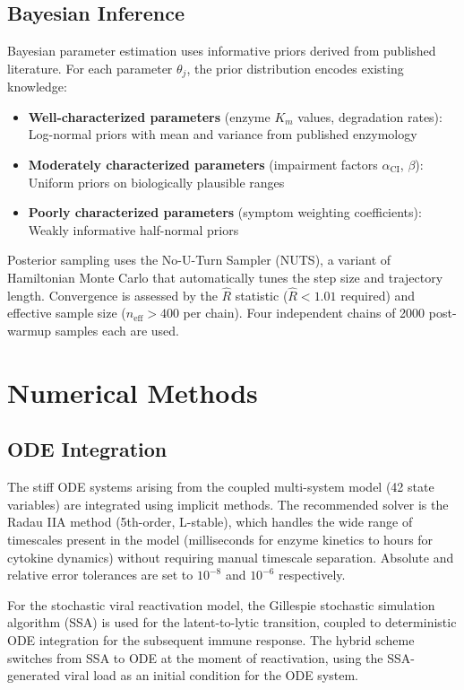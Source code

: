 \subsection{Bayesian Inference}

Bayesian parameter estimation uses informative priors derived from published literature. For each parameter $\theta_j$, the prior distribution encodes existing knowledge:

\begin{itemize}
    \item \textbf{Well-characterized parameters} (enzyme $K_m$ values, degradation rates): Log-normal priors with mean and variance from published enzymology
    \item \textbf{Moderately characterized parameters} (impairment factors $\alpha_{\text{CI}}$, $\beta$): Uniform priors on biologically plausible ranges
    \item \textbf{Poorly characterized parameters} (symptom weighting coefficients): Weakly informative half-normal priors
\end{itemize}

Posterior sampling uses the No-U-Turn Sampler (NUTS), a variant of Hamiltonian Monte Carlo that automatically tunes the step size and trajectory length. Convergence is assessed by the $\hat{R}$ statistic ($\hat{R} < 1.01$ required) and effective sample size ($n_{\text{eff}} > 400$ per chain). Four independent chains of 2000 post-warmup samples each are used.

\section{Numerical Methods}
\label{sec:numerical-methods}

\subsection{ODE Integration}

The stiff ODE systems arising from the coupled multi-system model (42 state variables) are integrated using implicit methods. The recommended solver is the Radau IIA method (5th-order, L-stable), which handles the wide range of timescales present in the model (milliseconds for enzyme kinetics to hours for cytokine dynamics) without requiring manual timescale separation. Absolute and relative error tolerances are set to $10^{-8}$ and $10^{-6}$ respectively.

For the stochastic viral reactivation model, the Gillespie stochastic simulation algorithm (SSA) is used for the latent-to-lytic transition, coupled to deterministic ODE integration for the subsequent immune response. The hybrid scheme switches from SSA to ODE at the moment of reactivation, using the SSA-generated viral load as an initial condition for the ODE system.

